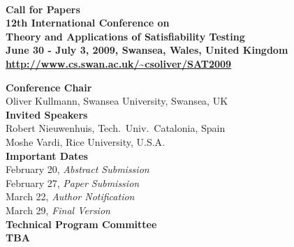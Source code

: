 \documentclass[10pt]{article}
\newcommand{\bthlight}[1]{{\color[rgb]{0.2,0.2,0.5}#1}}
\newcommand{\bhlight}[1]{{\color[rgb]{0.2,0.2,0.6}#1}}
\begin{document}
\pagestyle{empty}

\begin{center}
  {\bf
    \bthlight{{\huge SAT 2009}} \\[0.3cm]
    {\Large Call for Papers} \\[0.15cm]
    \bthlight{
      {\LARGE 12th International Conference on} \\[0.2cm]
      {\LARGE Theory and Applications of Satisfiability Testing} \\[0.15cm]
      {\Large June 30 - July 3, 2009, Swansea, Wales, United Kingdom}
    } \\[0.15cm]
    {\large \url{http://www.cs.swan.ac.uk/~csoliver/SAT2009}}
  }
\end{center}

\vspace*{-0.1cm}
%
\begin{minipage}[t]{7.5cm}
{\large {\bf \bhlight{Conference Chair}}} \\[0.05cm]
{\small
  Oliver Kullmann, Swansea University, Swansea, UK\\[0.3cm]
}
{\large {\bf \bhlight{Invited Speakers}}} \\%
{\small
  Robert Nieuwenhuis, Tech.~Univ.~Catalonia, Spain\\
  Moshe Vardi, Rice University, U.S.A.\\[0.3cm]
}
{\large {\bf \bhlight{Important Dates}}} \\[0.05cm]
{\small
  February 20, {\em Abstract Submission} \\
  February 27, {\em Paper Submission} \\
  March 22, {\em Author Notification} \\
  March 29, {\em Final Version} \\[0.3cm]
}
{\large {\bf \bhlight{Technical Program Committee}}} \\[0.05cm]
{\small
  {\bf TBA}
}
\end{minipage}
\end{document}
